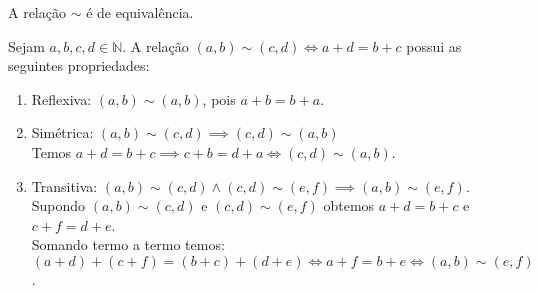 \documentclass[../main.tex]{subfiles}
\begin{document}
\begin{teo}\label{int-teo-classeEquivalenciaNumero}
    A relação $\sim$ é de equivalência.
\end{teo}
\begin{dem}
    Sejam $a,b,c,d \in \mathbb{N}$. A relação $(a,b) \sim (c,d) \iff a+d = b+c$ possui as seguintes propriedades:
    \begin{enumerate}[label=(\roman*)]
        \item Reflexiva: $(a,b) \sim (a,b)$, pois $ a+b=b+a$.
        \item Simétrica: $(a,b) \sim (c,d) \implies (c,d) \sim (a,b)$ \\
        Temos $ a+d = b+c \implies c+b = d+a \iff (c,d) \sim (a,b)$.
        \item Transitiva: $(a,b) \sim (c,d) \land (c,d) \sim (e,f) \implies (a,b) \sim (e,f)$. \\
        Supondo $(a,b) \sim (c,d) $ e $(c,d) \sim (e,f)$ obtemos $a+d=b+c$ e $c+f=d+e$. \\
        Somando termo a termo temos: \\ 
        $(a+d)+(c+f)= (b+c)+(d+e) \iff a+f = b+e \iff (a,b) \sim (e,f)$.
    \end{enumerate}
\end{dem}
\end{document}
